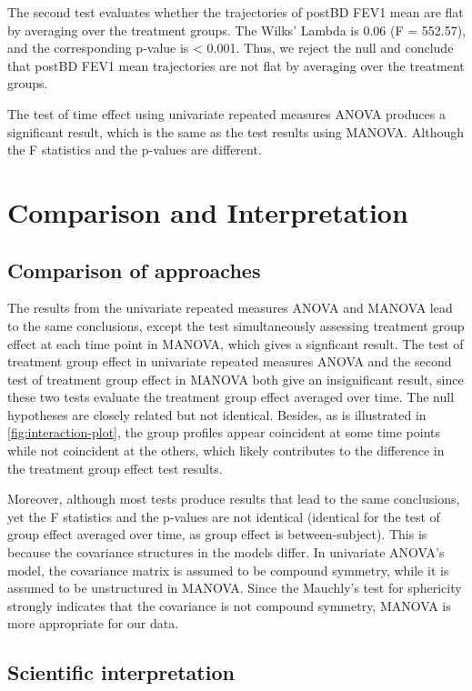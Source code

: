 \documentclass[12pt]{article}
\begin{document}
The second test evaluates whether the trajectories
of postBD FEV1 mean are flat by averaging over the
treatment groups. The Wilks' Lambda is 0.06 (F = 552.57), and the
corresponding p-value is < 0.001. Thus, we reject the null and conclude that
postBD FEV1 mean trajectories are not flat by averaging over the treatment
groups.

The test of time effect using univariate repeated measures ANOVA
produces a significant result,
which is the same as the test results using MANOVA.
Although the F statistics and the p-values
are different.


\section{Comparison and Interpretation}

\subsection{Comparison of approaches}
The results from the univariate repeated measures ANOVA and
MANOVA lead to the same conclusions,
except the test simultaneously assessing treatment group effect
at each time point in MANOVA, which gives a signficant result.
The test of treatment group effect in univariate repeated measures ANOVA
and the second test of treatment group effect in MANOVA both give
an insignificant result, since these two tests 
evaluate the treatment group effect averaged over time.
The null hypotheses are closely related but not identical.
Besides, as is illustrated in \cref{fig:interaction-plot},
the group profiles appear coincident at some time points while
not coincident at the others, which likely contributes to
the difference in the treatment group effect test results.

Moreover, although most tests produce results that lead to
the same conclusions, yet the F statistics and the p-values
are not identical (identical for the test of group
effect averaged over time, as group effect is between-subject). 
This is because the covariance structures in the models
differ. In univariate ANOVA's model, the covariance matrix is
assumed to be
compound symmetry, while it is assumed to be unstructured in MANOVA.
Since the Mauchly's test for sphericity strongly indicates that
the covariance is not compound symmetry, MANOVA is more
appropriate for our data.

\subsection{Scientific interpretation}
\end{document}
